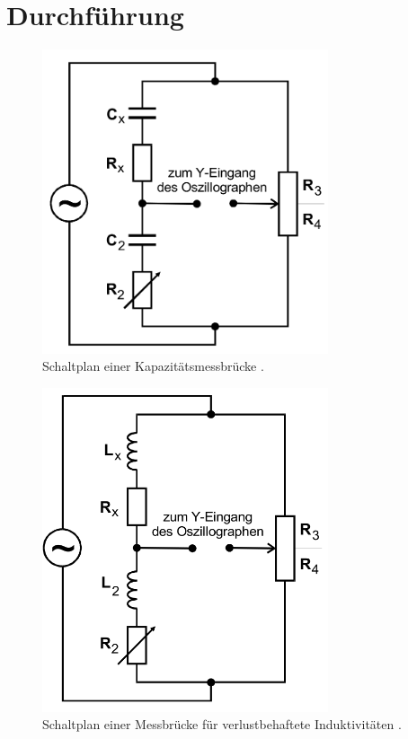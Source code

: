 \section{Durchführung}
\label{sec:Durchführung}






\begin{figure}[H]
    \centering
    \includegraphics[width=0.75\textwidth]{dateien/aufgabeb).png}
    \caption{Schaltplan einer Kapazitätsmessbrücke \cite{anleitung}.}
    \label{fig:schaltungb}
\end{figure}

\begin{figure}[H]
    \centering
    \includegraphics[width=0.75\textwidth]{dateien/aufgabec).png}
    \caption{Schaltplan einer Messbrücke für verlustbehaftete Induktivitäten \cite{anleitung}.}
    \label{fig:schaltungc}
\end{figure}

